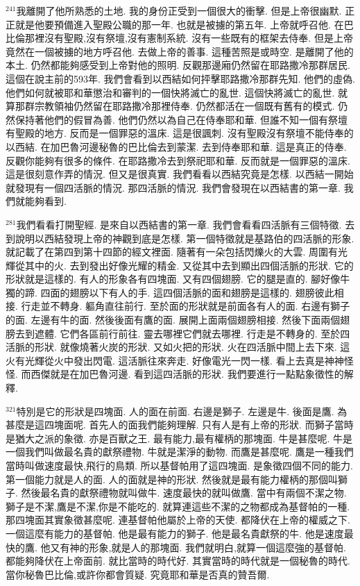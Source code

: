 \documentclass{book}
\begin{document}
$^{241}$我離開了他所熟悉的土地.
我的身份正受到一個很大的衝擊.
但是上帝很幽默.
正正就是他要預備進入聖殿公職的那一年.
也就是被擄的第五年.
上帝就呼召他.
在巴比倫那裡沒有聖殿,沒有祭壇,沒有憲制系統.
沒有一些既有的框架去侍奉.
但是上帝竟然在一個被擄的地方呼召他.
去做上帝的善事.
這種苦照是或時空.
是離開了他的本土.
仍然都能夠感受到上帝對他的照明.
反觀那邊廂仍然留在耶路撒冷那群居民.
這個在說主前的593年.
我們會看到以西結如何抨擊耶路撒冷那群先知.
他們的虛偽.
他們如何就被耶和華懲治和審判的一個快將滅亡的亂世.
這個快將滅亡的亂世.
就算那群宗教領袖仍然留在耶路撒冷那裡侍奉.
仍然都活在一個既有舊有的模式.
仍然保持著他們的假冒為善.
他們仍然以為自己在侍奉耶和華.
但誰不知一個有祭壇有聖殿的地方.
反而是一個罪惡的溫床.
這是很諷刺.
沒有聖殿沒有祭壇不能侍奉的以西結.
在加巴魯河邊秘魯的巴比倫去到蒙潔.
去到侍奉耶和華.
這是真正的侍奉.
反觀你能夠有很多的條件.
在耶路撒冷去到祭祀耶和華.
反而就是一個罪惡的溫床.
這是很刻意作弄的情況.
但又是很真實.
我們看看以西結究竟是怎樣.
以西結一開始就發現有一個四活脈的情況.
那四活脈的情況.
我們會發現在以西結書的第一章.
我們就能夠看到.

$^{281}$我們看看打開聖經.
是來自以西結書的第一章.
我們會看看四活脈有三個特徵.
去到說明以西結發現上帝的神觀到底是怎樣.
第一個特徵就是基路伯的四活脈的形象.
就記載了在第四到第十四節的經文裡面.
隨著有一朵包括閃爍火的大雲.
周圍有光輝從其中的火.
去到發出好像光耀的精金.
又從其中去到顯出四個活脈的形狀.
它的形狀就是這樣的.
有人的形象各有四塊面.
又有四個翅膀.
它的腿是直的.
腳好像牛獨的蹄.
四面的翅膀以下有人的手.
這四個活脈的面和翅膀是這樣的.
翅膀彼此相接.
行走並不轉身.
軀角直往前行.
至於面的形狀就是前面各有人的面.
右邊有獅子的面.
左邊有牛的面.
然後後面有鷹的面.
展開上面兩個翅膀相接.
然後下面兩個翅膀去到遮體.
它們各區前行前往.
靈去哪裡它們就去哪裡.
行走是不轉身的.
至於四活脈的形狀.
就像燒著火炭的形狀.
又如火把的形狀.
火在四活脈中間上去下來.
這火有光輝從火中發出閃電.
這活脈往來奔走.
好像電光一閃一樣.
看上去真是神神怪怪.
而西傑就是在加巴魯河邊.
看到這四活脈的形狀.
我們要進行一點點象徵性的解釋.

$^{321}$特別是它的形狀是四塊面.
人的面在前面.
右邊是獅子.
左邊是牛.
後面是鷹.
為甚麼是這四塊面呢.
首先人的面我們能夠理解.
只有人是有上帝的形狀.
而獅子當時是猶大之派的象徵.
亦是百獸之王.
最有能力,最有權柄的那塊面.
牛是甚麼呢.
牛是一個我們叫做最名貴的獻祭禮物.
牛就是潔淨的動物.
而鷹是甚麼呢.
鷹是一種我們當時叫做速度最快,飛行的鳥類.
所以基督帕用了這四塊面.
是象徵四個不同的能力.
第一個能力就是人的面.
人的面就是神的形狀.
然後就是最有能力權柄的那個叫獅子.
然後最名貴的獻祭禮物就叫做牛.
速度最快的就叫做鷹.
當中有兩個不潔之物.
獅子是不潔,鷹是不潔,你是不能吃的.
就算連這些不潔的之物都成為基督帕的一種.
那四塊面其實象徵甚麼呢.
連基督帕他屬於上帝的天使.
都降伏在上帝的權威之下.
一個這麼有能力的基督帕.
他是最有能力的獅子.
他是最名貴獻祭的牛.
他是速度最快的鷹.
他又有神的形象,就是人的那塊面.
我們就明白,就算一個這麼強的基督帕.
都能夠降伏在上帝面前.
就比當時的時代好.
其實當時的時代就是一個秘魯的時代.
當你秘魯巴比倫,或許你都會質疑.
究竟耶和華是否真的贊吾爾.
\end{document}
